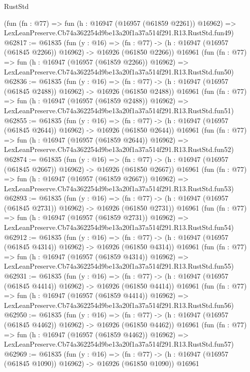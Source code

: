\begin{lexlean}{RustStd}
\begin{coremodule}
    (fun (fn : @77) =>
    fun (h : @16947 (@16957 (@61859 @2261)) @16962) =>
    LexLeanPreserve.Cb74a362254d9be13a20f1a37a514f291.R13.RustStd.fun49)
@62817 := @61835
    (fun (y : @16) =>
    (fn : @77) -> (h : @16947 (@16957 (@61845 @2266)) @16962) -> @16926 (@61850 @2266))
    @16961
    (fun (fn : @77) =>
    fun (h : @16947 (@16957 (@61859 @2266)) @16962) =>
    LexLeanPreserve.Cb74a362254d9be13a20f1a37a514f291.R13.RustStd.fun50)
@62836 := @61835
    (fun (y : @16) =>
    (fn : @77) -> (h : @16947 (@16957 (@61845 @2488)) @16962) -> @16926 (@61850 @2488))
    @16961
    (fun (fn : @77) =>
    fun (h : @16947 (@16957 (@61859 @2488)) @16962) =>
    LexLeanPreserve.Cb74a362254d9be13a20f1a37a514f291.R13.RustStd.fun51)
@62855 := @61835
    (fun (y : @16) =>
    (fn : @77) -> (h : @16947 (@16957 (@61845 @2644)) @16962) -> @16926 (@61850 @2644))
    @16961
    (fun (fn : @77) =>
    fun (h : @16947 (@16957 (@61859 @2644)) @16962) =>
    LexLeanPreserve.Cb74a362254d9be13a20f1a37a514f291.R13.RustStd.fun52)
@62874 := @61835
    (fun (y : @16) =>
    (fn : @77) -> (h : @16947 (@16957 (@61845 @2667)) @16962) -> @16926 (@61850 @2667))
    @16961
    (fun (fn : @77) =>
    fun (h : @16947 (@16957 (@61859 @2667)) @16962) =>
    LexLeanPreserve.Cb74a362254d9be13a20f1a37a514f291.R13.RustStd.fun53)
@62893 := @61835
    (fun (y : @16) =>
    (fn : @77) -> (h : @16947 (@16957 (@61845 @2731)) @16962) -> @16926 (@61850 @2731))
    @16961
    (fun (fn : @77) =>
    fun (h : @16947 (@16957 (@61859 @2731)) @16962) =>
    LexLeanPreserve.Cb74a362254d9be13a20f1a37a514f291.R13.RustStd.fun54)
@62912 := @61835
    (fun (y : @16) =>
    (fn : @77) -> (h : @16947 (@16957 (@61845 @4314)) @16962) -> @16926 (@61850 @4314))
    @16961
    (fun (fn : @77) =>
    fun (h : @16947 (@16957 (@61859 @4314)) @16962) =>
    LexLeanPreserve.Cb74a362254d9be13a20f1a37a514f291.R13.RustStd.fun55)
@62931 := @61835
    (fun (y : @16) =>
    (fn : @77) -> (h : @16947 (@16957 (@61845 @4414)) @16962) -> @16926 (@61850 @4414))
    @16961
    (fun (fn : @77) =>
    fun (h : @16947 (@16957 (@61859 @4414)) @16962) =>
    LexLeanPreserve.Cb74a362254d9be13a20f1a37a514f291.R13.RustStd.fun56)
@62950 := @61835
    (fun (y : @16) =>
    (fn : @77) -> (h : @16947 (@16957 (@61845 @4462)) @16962) -> @16926 (@61850 @4462))
    @16961
    (fun (fn : @77) =>
    fun (h : @16947 (@16957 (@61859 @4462)) @16962) =>
    LexLeanPreserve.Cb74a362254d9be13a20f1a37a514f291.R13.RustStd.fun57)
@62969 := @61835
    (fun (y : @16) =>
    (fn : @77) -> (h : @16947 (@16957 (@61845 @1090)) @16962) -> @16926 (@61850 @1090))
    @16961

\end{coremodule}
\end{lexlean}
